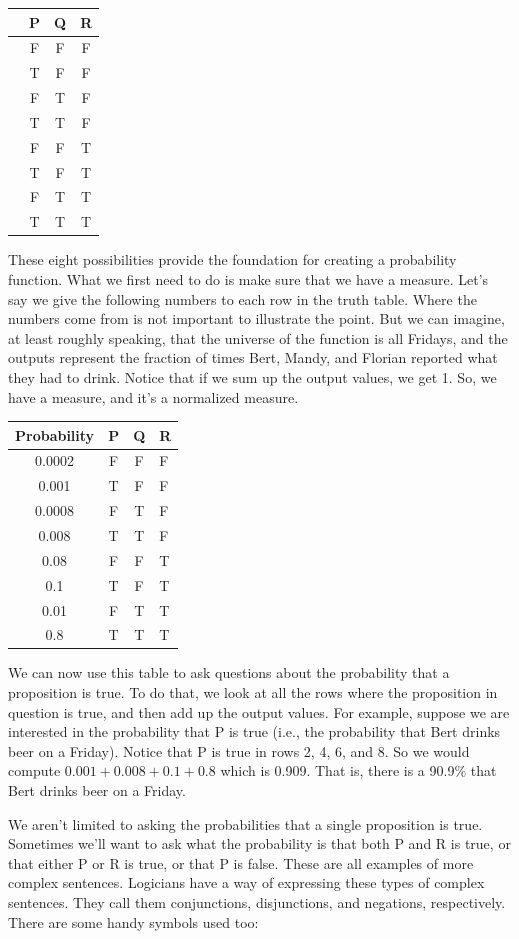 \documentclass[]{tufte-book}
\begin{document}
\begin{longtable}[]{@{}lccc@{}}
\toprule
& P & Q & R\tabularnewline
\midrule
\endhead
& F & F & F\tabularnewline
& T & F & F\tabularnewline
& F & T & F\tabularnewline
& T & T & F\tabularnewline
& F & F & T\tabularnewline
& T & F & T\tabularnewline
& F & T & T\tabularnewline
& T & T & T\tabularnewline
\bottomrule
\end{longtable}

These eight possibilities provide the foundation for creating a probability function. What we first need to do is make sure that we have a measure. Let's say we give the following numbers to each row in the truth table. Where the numbers come from is not important to illustrate the point. But we can imagine, at least roughly speaking, that the universe of the function is all Fridays, and the outputs represent the fraction of times Bert, Mandy, and Florian reported what they had to drink. Notice that if we sum up the output values, we get 1. So, we have a measure, and it's a normalized measure.

\begin{longtable}[]{@{}cccl@{}}
\toprule
Probability & P & Q & R\tabularnewline
\midrule
\endhead
0.0002 & F & F & F\tabularnewline
0.001 & T & F & F\tabularnewline
0.0008 & F & T & F\tabularnewline
0.008 & T & T & F\tabularnewline
0.08 & F & F & T\tabularnewline
0.1 & T & F & T\tabularnewline
0.01 & F & T & T\tabularnewline
0.8 & T & T & T\tabularnewline
\bottomrule
\end{longtable}

We can now use this table to ask questions about the probability that a proposition is true. To do that, we look at all the rows where the proposition in question is true, and then add up the output values. For example, suppose we are interested in the probability that P is true (i.e., the probability that Bert drinks beer on a Friday). Notice that P is true in rows 2, 4, 6, and 8. So we would compute \(0.001+0.008+0.1+0.8\) which is 0.909. That is, there is a 90.9\% that Bert drinks beer on a Friday.

We aren't limited to asking the probabilities that a single proposition is true. Sometimes we'll want to ask what the probability is that both P and R is true, or that either P or R is true, or that P is false. These are all examples of more complex sentences. Logicians have a way of expressing these types of complex sentences. They call them conjunctions, disjunctions, and negations, respectively. There are some handy symbols used too:
\end{document}
